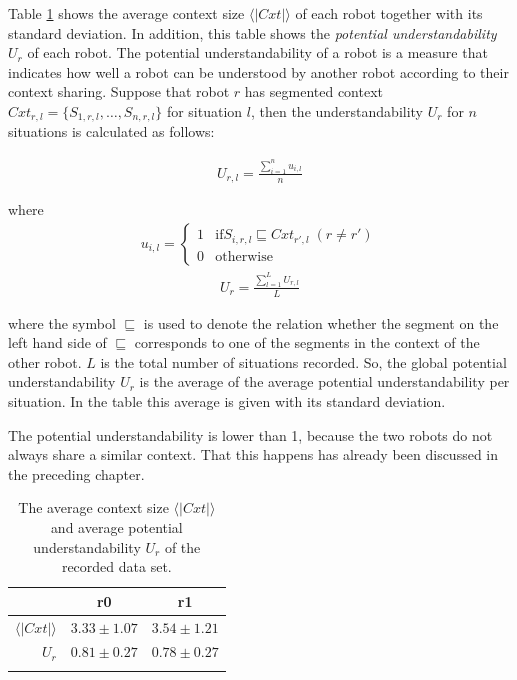 Table \ref{t:st:data} shows the average context size $\langle |Cxt| \rangle$ of each robot together with its standard deviation. In addition, this table shows the {\em potential understandability} $U_r$ of each robot. The potential understandability of a robot is a measure that indicates how well a robot can be understood by another robot according to their context sharing. Suppose that robot $r$ has segmented context $Cxt_{r,l}=\{S_{1,r,l},\ldots,S_{n,r,l}\}$ for situation $l$, then the understandability $U_r$ for $n$ situations is calculated as follows:

\begin{eqnarray}
U_{r,l}=\frac{\sum_{i=1}^n u_{i,l}}{n}
\end{eqnarray}

where
\begin{eqnarray}
u_{i,l} = \left \{ \begin{array}{rl}
1 & \mbox{if} S_{i,r,l} \sqsubseteq Cxt_{r',l} \; (r \neq r')\\
0 & \mbox{otherwise}
\end{array} \right.
\end{eqnarray}
\begin{eqnarray}
U_r = \frac{\sum_{l=1}^L U_{r,l}}{L}
\end{eqnarray}


where the symbol $\sqsubseteq$ is used to denote the relation whether the segment on the left hand side of $\sqsubseteq$ corresponds to one of the segments in the context of the other robot. $L$ is the total number of situations recorded. So, the global potential understandability $U_r$ is the average of the average potential understandability per situation. In the table this average is given with its standard deviation.

The potential understandability is lower than 1, because the two robots do not always share a similar context. That this happens has already been discussed in the preceding chapter.

\begin{table}
\centering
\begin{tabular}{rcc}
\lsptoprule
 & r0 & r1\\\midrule
$\langle|Cxt|\rangle$ & $3.33 \pm 1.07$ & $3.54 \pm 1.21$\\
$U_r$ & $0.81 \pm 0.27$ & $0.78 \pm 0.27$\\
\lspbottomrule
\end{tabular}
\caption{The average context size $\langle|Cxt|\rangle$ and average potential understandability $U_r$ of the recorded data set.}
\label{t:st:data}
\end{table}


